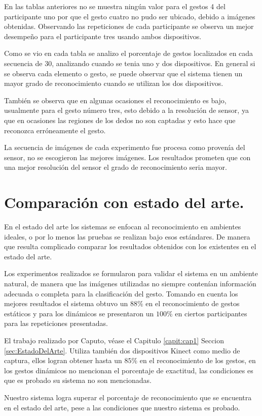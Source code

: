 \begin{itemize}
En las tablas anteriores no se muestra ningún valor para el gestos 4 del participante uno por que el gesto cuatro no pudo ser ubicado, debido a imágenes obtenidas. Observando las repeticiones de cada participante se observa un mejor desempeño para el participante tres usando ambos dispositivos.  

\end{itemize}

Como se vio en cada tabla se analizo el porcentaje de gestos localizados en cada secuencia de $30$, analizando cuando se tenia uno y dos dispositivos. En general si se observa cada elemento o gesto, se puede observar que el sistema tienen un mayor grado de reconocimiento cuando se utilizan los dos dispositivos.    

También se observa que en algunas ocasiones el reconocimiento es bajo, usualmente para el gesto n\'umero tres, esto debido a la resolución de sensor, ya que en ocasiones las regiones de los dedos no son captadas y esto hace que reconozca erróneamente el gesto. 

La secuencia de imágenes de cada experimento fue procesa como provenía del sensor, no se escogieron las mejores imágenes. Los resultados prometen que con una mejor resolución del sensor el grado de reconocimiento seria mayor. 

\section{Comparación con estado del arte.}  

En el estado del arte los sistemas se enfocan al reconocimiento en ambientes ideales, o por lo menos las pruebas se realizan bajo esos estándares. De manera que resulta complicado comparar los resultados obtenidos con los existentes en el estado del arte.

Los experimentos realizados se formularon para validar el sistema en un ambiente natural, de manera que las imágenes utilizadas no siempre contenían información adecuada o completa para la clasificación del gesto. Tomando en cuenta los mejores resultados el sistema obtuvo un $88 \%$ en el reconocimiento de gestos estáticos y para los dinámicos se presentaron un $100 \%$ en ciertos participantes para las repeticiones presentadas. 

El trabajo realizado por Caputo, véase el Capitulo \ref{capit:cap1} Seccion \ref{sec:EstadoDelArte}. Utiliza también dos dispositivos Kinect como medio de captura, ellos logran obtener hasta un $85 \%$ en el reconocimiento de los gestos, en los gestos dinámicos no mencionan el porcentaje de exactitud, las condiciones es que es probado su sistema no son mencionadas. 

Nuestro sistema logra superar el porcentaje de reconocimiento que se encuentra en el estado del arte, pese a las condiciones que nuestro sistema es probado.  


\newpage
